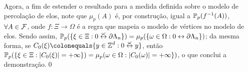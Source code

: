 Agora, a fim de estender o resultado para a medida definida sobre o modelo de percolação de elos, note que $\mu_p(A)$ é, por construção, igual a $\operatorname{\mathbb{P}}_p(f^{-1}(A))$, $\forall A \in \operatorname{\mathcal{F}}$, onde $f: \Xi \longrightarrow \Omega$ é a regra que mapeia o modelo de vértices no modelo de elos. Sendo assim, $\operatorname{\mathbb{P}}_p(\{\xi \in \Xi : 0 \overset{\omega}{\leftrightarrow} \partial\Lambda_n\}) = \mu_p(\{\omega \in \Omega : 0 \leftrightarrow \partial\Lambda_n\})$; da mesma forma, se $C_0(\xi) \colonequals \{y \in \ZX^d : 0 \overset{\omega}{\leftrightarrow} y\}$, então $\operatorname{\mathbb{P}}_p(\{\xi \in \Xi : |C_0(\xi)| = +\infty\}) = \mu_p(\omega \in \Omega : |C_0(\omega)| = +\infty\})$, o que conclui a demonstração.\hspace{\fill}\qed

